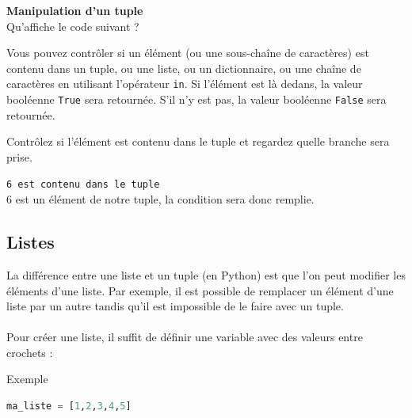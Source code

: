     \begin{Exercice}[5 minutes] [Python] \textbf{Manipulation d'un tuple}\\
        
        Qu'affiche le code suivant ? \\
        
        \begin{conseil}
        Vous pouvez contrôler si un élément (ou une sous-chaîne de caractères) est contenu dans un tuple, ou une liste, ou un dictionnaire, ou une chaîne de caractères en utilisant l'opérateur \lstinline{in}. Si l'élément est là dedans, la valeur booléenne \lstinline{True} sera retournée. S'il n'y est pas, la valeur booléenne \lstinline{False} sera retournée. 
        \end{conseil}
        
        
        
    
        \begin{conseil}
            Contrôlez si l'élément est contenu dans le tuple et regardez quelle branche sera prise.
        \end{conseil}
        
        \begin{solution}
           \faTerminal \texttt{6 est contenu dans le tuple} \\
           6 est un élément de notre tuple, la condition sera donc remplie.
        \end{solution}
    \end{Exercice}
    
    \subsection{Listes}
    La différence entre une liste et un tuple (en Python) est que l'on peut modifier les éléments d'une liste. Par exemple, il est possible de remplacer un élément d'une liste par un autre tandis qu'il est impossible de le faire avec un tuple.
    \\ \\
    Pour créer une liste, il suffit de définir une variable avec des valeurs entre crochets :
    \begin{Example}{\faTerminal \quad Exemple}
        \begin{lstlisting}[language=Python]
ma_liste = [1,2,3,4,5]   \end{lstlisting}
    \end{Example}
    
